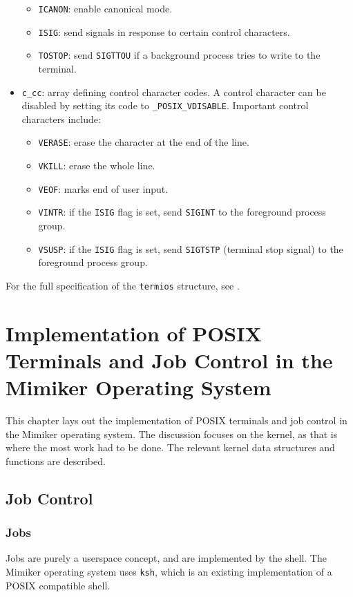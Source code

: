 \documentclass[shortabstract, manyadvisors, english, mgr]{iithesis}
\begin{document}
\begin{itemize}
\begin{itemize}
  \item \texttt{ICANON}: enable canonical mode.
  \item \texttt{ISIG}: send signals in response to certain control characters.
  \item \texttt{TOSTOP}: send \texttt{SIGTTOU} if a background process tries to
    write to the terminal.
  \end{itemize}
\item \texttt{c\_cc}: array defining control character codes. A control
  character can be disabled by setting its code to \texttt{\_POSIX\_VDISABLE}.
  Important control characters include:
  \begin{itemize}
  \item \texttt{VERASE}: erase the character at the end of the line.
  \item \texttt{VKILL}: erase the whole line.
  \item \texttt{VEOF}: marks end of user input.
  \item \texttt{VINTR}: if the \texttt{ISIG} flag is set, send \texttt{SIGINT}
    to the foreground process group.
  \item \texttt{VSUSP}: if the \texttt{ISIG} flag is set, send \texttt{SIGTSTP}
    (terminal stop signal) to the foreground process group.
  \end{itemize}
\end{itemize}
For the full specification of the \texttt{termios} structure, see
\cite{termios}.

\chapter{Implementation of POSIX Terminals and Job Control in the Mimiker
  Operating System}

This chapter lays out the implementation of POSIX terminals and job control in
the Mimiker operating system. The discussion focuses on the kernel, as that is
where the most work had to be done. The relevant kernel data structures and
functions are described.

\section{Job Control}
\subsection{Jobs}
Jobs are purely a userspace concept, and are implemented by the shell. The
Mimiker operating system uses \texttt{ksh}, which is an existing implementation
of a POSIX compatible shell.
\end{document}
